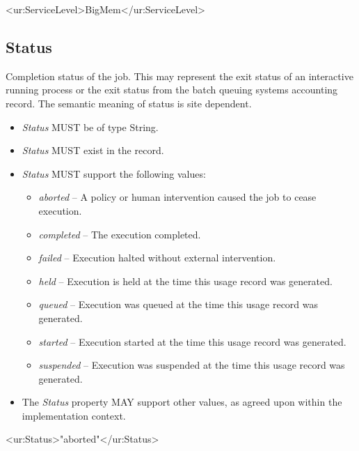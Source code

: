 \begin{XMLexample}
<ur:ServiceLevel>BigMem</ur:ServiceLevel>
\end{XMLexample}






\subsection{Status}

Completion status of the job. This may
represent the exit status of an interactive running process or the exit status from the batch queuing systems accounting record. The semantic meaning of status is site dependent.
\begin{itemize}
\item \emph{Status} MUST be of type String.
\item \emph{Status} MUST exist in the record.
\item  \emph{Status} MUST support the following values:
\begin{itemize}
\item \emph{aborted} – A policy or human intervention caused the job to cease execution.
\item \emph{completed} – The execution completed.
\item \emph{failed} – Execution halted without external intervention.
\item \emph{held} – Execution is held at the time this usage record was generated.
\item \emph{queued} – Execution was queued at the time this usage record was generated.
\item \emph{started} – Execution started at the time this usage record was generated.
\item \emph{suspended} – Execution was suspended at the time this usage record was generated.
\end{itemize}
\item The \emph{Status} property MAY support other values, as agreed upon within the implementation context.
\end{itemize}

\begin{XMLexample}
<ur:Status>"aborted"</ur:Status>
\end{XMLexample}
